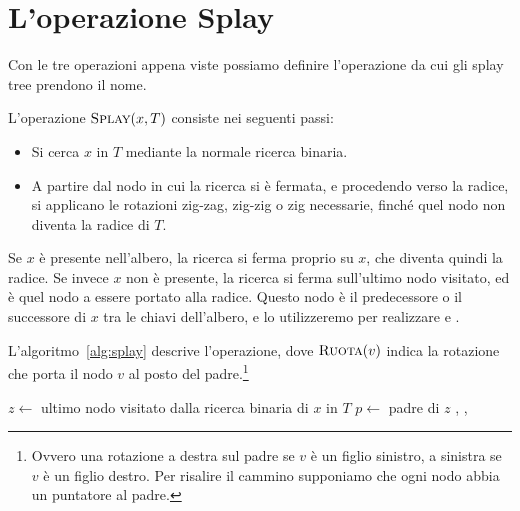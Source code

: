 \section{L'operazione Splay}\label{sec:splay}
Con le tre operazioni appena viste possiamo definire l'operazione da cui gli splay tree prendono il nome.

\begin{definizione}[Splay]\label{def:splay}
L'operazione $\Splay(x,T)$ consiste nei seguenti passi:
\begin{itemize}
    \item Si cerca $x$ in $T$ mediante la normale ricerca binaria.
    \item A partire dal nodo in cui la ricerca si è fermata, e procedendo verso la radice, si applicano le rotazioni zig-zag, zig-zig o zig necessarie, finché quel nodo non diventa la radice di $T$.
\end{itemize}
\end{definizione}

Se $x$ è presente nell'albero, la ricerca si ferma proprio su $x$, che diventa quindi la radice. Se invece $x$ non è presente, la ricerca si ferma sull'ultimo nodo visitato, ed è quel nodo a essere portato alla radice. Questo nodo è il predecessore o il successore di $x$ tra le chiavi dell'albero, e lo utilizzeremo per realizzare \Insert{} e \Delete.

L'algoritmo~\ref{alg:splay} descrive l'operazione, dove $\textsc{Ruota}(v)$ indica la rotazione che porta il nodo $v$ al posto del padre.\footnote{Ovvero una rotazione a destra sul padre se $v$ è un figlio sinistro, a sinistra se $v$ è un figlio destro. Per risalire il cammino supponiamo che ogni nodo abbia un puntatore al padre.}

\begin{algorithm}[htbp]
\caption{L'operazione $\Splay(x,T)$ porta alla radice il nodo $z$ in cui termina la ricerca di $x$. A ogni passo si sceglie tra zig, zig-zig e zig-zag in base alla posizione di $z$ rispetto al padre e al nonno.}\label{alg:splay}
\begin{algorithmic}[1]
  \State $z \gets$ ultimo nodo visitato dalla ricerca binaria di $x$ in $T$
    \State $p \gets$ padre di $z$
      \State {} 
      \State {},  
    \Else
      \State {},  
    \EndIf
  \EndWhile
\EndProcedure
\end{algorithmic}
\end{algorithm}

